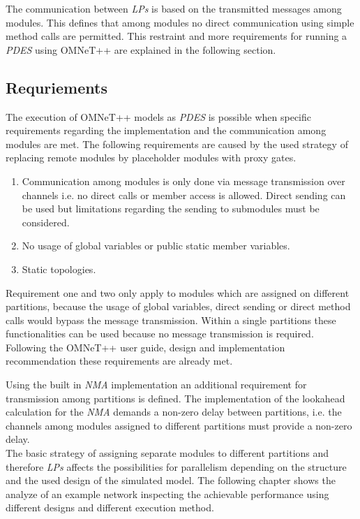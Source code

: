 The communication between \emph{LPs} is based on the transmitted messages among modules.
This defines that among modules no direct communication using simple method calls are permitted.
This restraint and more requirements for running a \emph{PDES} using OMNeT++ are explained in the following section.

\subsection{Requriements}
\label{sec:parallel_omnet_requirements}
The execution of OMNeT++ models as \emph{PDES} is possible when specific requirements regarding the implementation and the communication among modules are met.
The following requirements are caused by the used strategy of replacing remote modules by placeholder modules with proxy gates. \cite[section III.B]{varga_parallel_2003}

\begin{enumerate}
    \item Communication among modules is only done via message transmission over channels i.e. no direct calls or member access is allowed.
    Direct sending can be used but limitations regarding the sending to submodules must be considered.
    \item No usage of global variables or public static member variables.
    \item Static topologies.
\end{enumerate}

Requirement one and two only apply to modules which are assigned on different partitions, because the usage of global variables, direct sending or direct method calls would bypass the message transmission.
Within a single partitions these functionalities can be used because no message transmission is required.
Following the OMNeT++ user guide, design and implementation recommendation these requirements are already met. \cite[section III.B]{varga_parallel_2003}

Using the built in \emph{NMA} implementation an additional requirement for transmission among partitions is defined.
The implementation of the lookahead calculation for the \emph{NMA} demands a non-zero delay between partitions, i.e. the channels among modules assigned to different partitions must provide a non-zero delay. \cite[section 16.3.1]{omnet_manual}
\\

The basic strategy of assigning separate modules to different partitions and therefore \emph{LPs} affects the possibilities for parallelism depending on the structure and the used design of the simulated model.
The following chapter shows the analyze of an example network inspecting the achievable performance using different designs and different execution method.